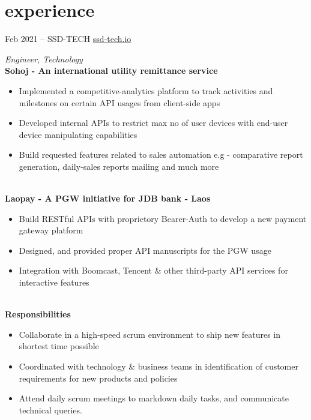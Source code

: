 \section{experience}
\begin{entrylist}

	\entry
	{Feb 2021 -- }
	{SSD-TECH}
	{\href{https://ssd-tech.io}{ssd-tech.io}}
	{\emph{Engineer, Technology} \newline
		\ \\
		\textbf{Sohoj - An international utility remittance service}
		\begin{itemize}
			\item Implemented a competitive-analytics platform to track activities and milestones on certain API usages from client-side apps
			\item Developed internal APIs to restrict max no of user devices with end-user device manipulating capabilities
			\item Build requested features related to sales automation e.g - comparative report generation, daily-sales reports mailing and much more
		\end{itemize}
		\ \\
		\textbf{Laopay - A PGW initiative for JDB bank - Laos}
		\begin{itemize}
			\item Build RESTful APIs with proprietory Bearer-Auth to develop a new payment gateway platform
			\item Designed, and provided proper API manuscripts for the PGW usage
			\item Integration with Boomcast, Tencent \& other third-party API services for interactive features
		\end{itemize}
		\ \\
		\textbf{Responsibilities}
		\begin{itemize}
			\item Collaborate in a high-speed scrum environment to ship new features in shortest time possible
			\item Coordinated with technology \& business teams in identification of customer requirements for new products and policies
			\item Attend daily scrum meetings to markdown daily tasks, and communicate technical queries.
		\end{itemize}
	}

\end{entrylist}